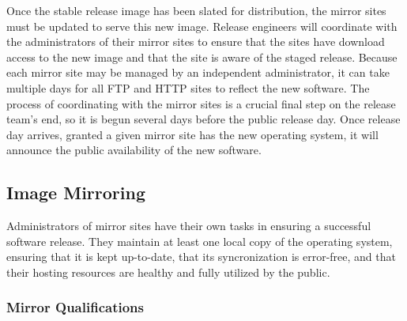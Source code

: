 \documentclass[conference]{IEEEtran}
\begin{document}
Once the stable release image has been slated for distribution,
the mirror sites must be updated to serve this new image.
Release engineers will coordinate with the administrators of their mirror
sites to ensure that the sites have download access to the new image and
that the site is aware of the staged release.
Because each mirror site may be managed by an independent administrator,
it can take multiple days for all FTP and HTTP sites
to reflect the new software.
The process of coordinating with the mirror sites is a crucial final step
on the release team's end, so it is begun several days before
the public release day.
Once release day arrives, granted a given mirror site has
the new operating system, it will announce the public availability
of the new software.

\subsection{Image Mirroring}

Administrators of mirror sites have their own tasks
in ensuring a successful software release.
They maintain at least one local copy of the operating system,
ensuring that it is kept up-to-date, that its syncronization
is error-free, and that their hosting resources are healthy
and fully utilized by the public.

\subsubsection{Mirror Qualifications}
\end{document}
